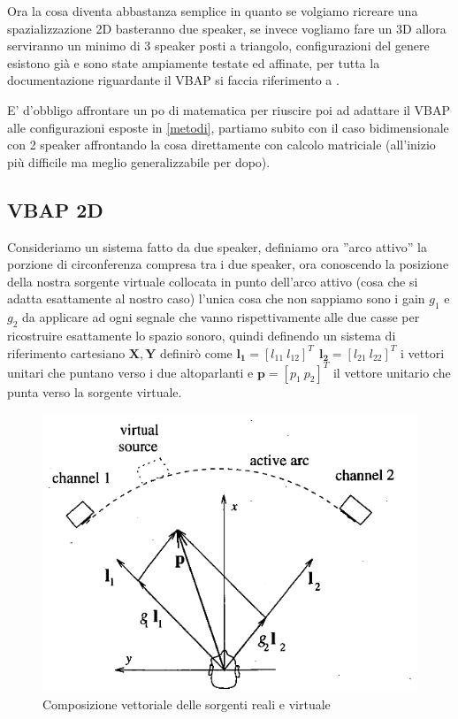 \documentclass[12pt,a4paper]{report}
\begin{document}
Ora la cosa diventa abbastanza semplice in quanto se volgiamo ricreare una spazializzazione 2D basteranno due speaker, se invece vogliamo fare un 3D allora serviranno un minimo di 3 speaker posti a triangolo, configurazioni del genere esistono già e sono state ampiamente testate ed affinate, per tutta la documentazione riguardante il VBAP si faccia riferimento a \cite{vbap}.

E' d'obbligo affrontare un po di matematica per riuscire poi ad adattare il VBAP alle configurazioni esposte in \ref{metodi}, partiamo subito con il caso bidimensionale con 2 speaker affrontando la cosa direttamente con calcolo matriciale (all'inizio più difficile ma meglio generalizzabile per dopo).

\subsection{VBAP 2D}\label{c}
Consideriamo un sistema fatto da due speaker, definiamo ora ''arco attivo'' la porzione di circonferenza compresa tra i due speaker, ora conoscendo la posizione della nostra sorgente virtuale collocata in punto dell'arco attivo (cosa che si adatta esattamente al nostro caso) l'unica cosa che non sappiamo sono i gain $g_1$ e $g_2$ da applicare ad ogni segnale che vanno rispettivamente alle due casse per ricostruire esattamente lo spazio sonoro, quindi definendo un sistema di riferimento cartesiano $ \boldsymbol{X},\boldsymbol{Y}$ definirò come $ \boldsymbol{l_{1}}= {\left[ l_{11} \ l_{12} \right]}^T \ \  \boldsymbol{l_{2}}= {\left[ l_{21} \ l_{22} \right]}^T$ i vettori unitari che puntano verso i due altoparlanti e $\boldsymbol{p}= {\left[ p_1 \ p_2 \right]}^T$ il vettore unitario che punta verso la sorgente virtuale.

\begin{figure}[htbp]
	\centering
	\includegraphics[scale=0.48]{figures/matrix2d.png}
	\caption {Composizione vettoriale delle sorgenti reali e virtuale}
	\label{fig:vettori2d}
	\end{figure}
\end{document}
